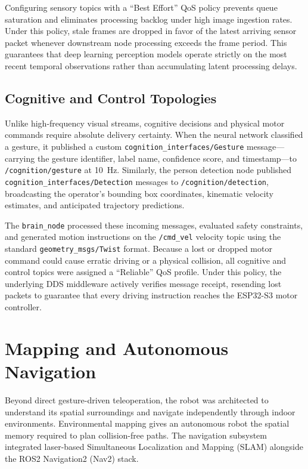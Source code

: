 Configuring sensory topics with a ``Best Effort'' QoS policy prevents queue saturation and eliminates processing backlog under high image ingestion rates. Under this policy, stale frames are dropped in favor of the latest arriving sensor packet whenever downstream node processing exceeds the frame period. This guarantees that deep learning perception models operate strictly on the most recent temporal observations rather than accumulating latent processing delays.

\subsection{Cognitive and Control Topologies}
Unlike high-frequency visual streams, cognitive decisions and physical motor commands require absolute delivery certainty. When the neural network classified a gesture, it published a custom \texttt{cognition\_interfaces/Gesture} message—carrying the gesture identifier, label name, confidence score, and timestamp—to \texttt{/cognition/gesture} at 10~Hz. Similarly, the person detection node published \texttt{cognition\_interfaces/Detection} messages to \texttt{/cognition/detection}, broadcasting the operator's bounding box coordinates, kinematic velocity estimates, and anticipated trajectory predictions.

The \texttt{brain\_node} processed these incoming messages, evaluated safety constraints, and generated motion instructions on the \texttt{/cmd\_vel} velocity topic using the standard \texttt{geometry\_msgs/Twist} format. Because a lost or dropped motor command could cause erratic driving or a physical collision, all cognitive and control topics were assigned a ``Reliable'' QoS profile. Under this policy, the underlying DDS middleware actively verifies message receipt, resending lost packets to guarantee that every driving instruction reaches the ESP32-S3 motor controller.

\section{Mapping and Autonomous Navigation}
Beyond direct gesture-driven teleoperation, the robot was architected to understand its spatial surroundings and navigate independently through indoor environments. Environmental mapping gives an autonomous robot the spatial memory required to plan collision-free paths. The navigation subsystem integrated laser-based Simultaneous Localization and Mapping (SLAM) alongside the ROS2 Navigation2 (Nav2) stack.


